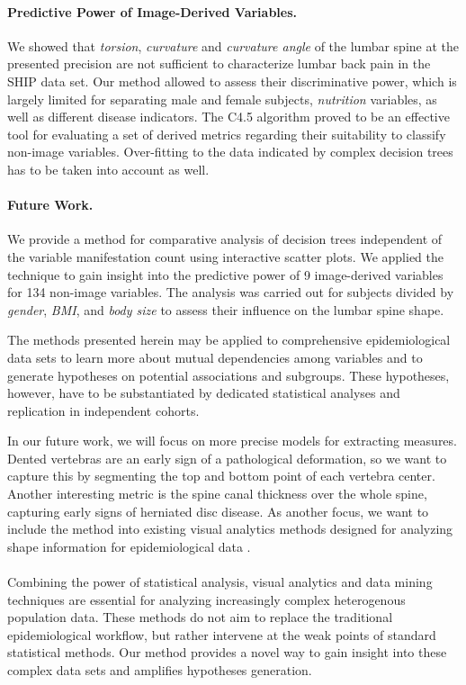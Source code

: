 \documentclass[a4paper,twoside]{style/article}
\begin{document}
\paragraph{Predictive Power of Image-Derived Variables.}
We showed that \emph{torsion}, \emph{curvature} and \emph{curvature angle} of the lumbar spine at the presented precision are not sufficient to characterize lumbar back pain in the SHIP data set.
Our method allowed to assess their discriminative power, which is largely limited for separating male and female subjects, \emph{nutrition} variables, as well as different disease indicators.
The C4.5 algorithm proved to be an effective tool for evaluating a set of derived metrics regarding their suitability to classify non-image variables.
Over-fitting to the data indicated by complex decision trees has to be taken into account as well.
\paragraph{Future Work.}
We provide a method for comparative analysis of decision trees independent of the variable manifestation count using interactive scatter plots.
We applied the technique to gain insight into the predictive power of 9 image-derived variables for 134 non-image variables.
The analysis was carried out for subjects divided by \emph{gender}, \emph{BMI}, and \emph{body size} to assess their influence on the lumbar spine shape.

The methods presented herein may be applied to comprehensive epidemiological data sets to learn more about mutual dependencies among variables and to generate hypotheses on potential associations and subgroups.
%
These hypotheses, however, have to be substantiated by dedicated statistical analyses and replication in independent cohorts.

In our future work, we will focus on more precise models for extracting measures.
Dented vertebras are an early sign of a pathological deformation, so we want to capture this by segmenting the top and bottom point of each vertebra center.
Another interesting metric is the spine canal thickness over the whole spine, capturing early signs of herniated disc disease.
As another focus, we want to include the method into existing visual analytics methods designed for analyzing shape information for epidemiological data \cite{Klemm2014VIS}.
\\\\
Combining the power of statistical analysis, visual analytics and data mining techniques are essential for analyzing increasingly complex heterogenous population data.
These methods do not aim to replace the traditional epidemiological workflow, but rather intervene at the weak points of standard statistical methods.
Our method provides a novel way to gain insight into these complex data sets and amplifies hypotheses generation.
\end{document}
